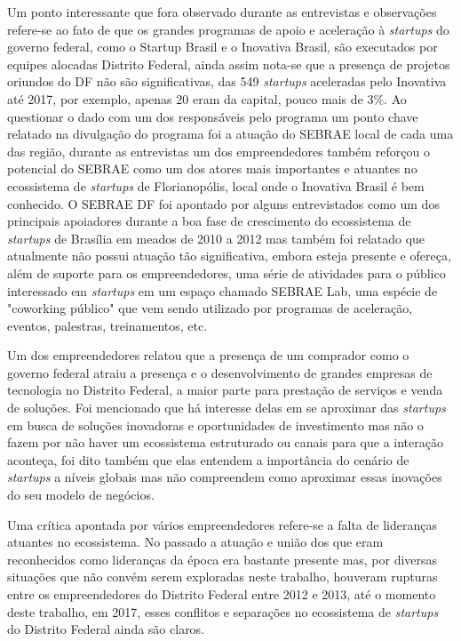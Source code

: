 Um ponto interessante que fora observado durante as entrevistas e observações refere-se ao fato de que os grandes programas de apoio e aceleração à \textit{startups} do governo federal, como o Startup Brasil e o Inovativa Brasil, são executados por equipes alocadas Distrito Federal, ainda assim nota-se que a presença de projetos oriundos do DF não são significativas, das 549 \textit{startups} aceleradas pelo Inovativa até 2017, por exemplo, apenas 20 eram da capital, pouco mais de 3\%. Ao questionar o dado com um dos responsáveis pelo programa um ponto chave relatado na divulgação do programa foi a atuação do SEBRAE local de cada uma das região, durante as entrevistas um dos empreendedores também reforçou o potencial do SEBRAE como um dos atores mais importantes e atuantes no ecossistema de \textit{startups} de Florianopólis, local onde o Inovativa Brasil é bem conhecido. O SEBRAE DF foi apontado por alguns entrevistados como um dos principais apoiadores durante a boa fase de crescimento do ecossistema de \textit{startups} de Brasília em meados de 2010 a 2012 mas também foi relatado que atualmente não possui atuação tão significativa, embora esteja presente e ofereça, além de suporte para os empreendedores, uma série de atividades para o público interessado em \textit{startups} em um espaço chamado SEBRAE Lab, uma espécie de "coworking público" que vem sendo utilizado por programas de aceleração, eventos, palestras, treinamentos, etc.

Um dos empreendedores relatou que a presença de um comprador como o governo federal atraiu a presença e o desenvolvimento de grandes empresas de tecnologia no Distrito Federal, a maior parte para prestação de serviços e venda de soluções. Foi mencionado que há interesse delas em se aproximar das \textit{startups} em busca de soluções inovadoras e oportunidades de investimento mas não o fazem por não haver um ecossistema estruturado ou canais para que a interação aconteça, foi dito também que elas entendem a importância do cenário de \textit{startups} a níveis globais mas não compreendem como aproximar essas inovações do seu modelo de negócios. 

Uma crítica apontada por vários empreendedores refere-se a falta de lideranças atuantes no ecossistema. No passado a atuação e união dos que eram reconhecidos como lideranças da época era bastante presente mas, por diversas situações que não convém serem exploradas neste trabalho, houveram rupturas entre os empreendedores do Distrito Federal entre 2012 e 2013, até o momento deste trabalho, em 2017, esses conflitos e separações no ecossistema de \textit{startups} do Distrito Federal ainda são claros. 

